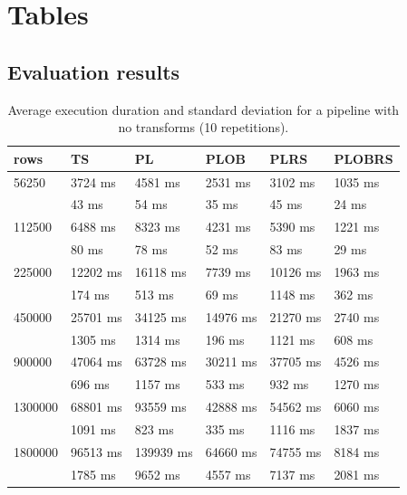 \section{Tables}
\label{appendix:example1}

\subsection{Evaluation results}
\label{app:eval:transforms}

\begin{table}[H]
	\caption{Average execution duration and standard deviation for a pipeline with no transforms (10 repetitions).}
	\label{tab:eval:none}
	\begin{center}
		\begin{tabular}{|l|l|l|l|l|l|}
			\hline
			rows    & TS       & PL        & PLOB     & PLRS     & PLOBRS  \\
			\hline
			\hline
			56250   & 3724 ms  & 4581 ms   & 2531 ms  & 3102 ms  & 1035 ms \\
			        & 43 ms    & 54 ms     & 35 ms    & 45 ms    & 24 ms   \\
			\hline
			112500  & 6488 ms  & 8323 ms   & 4231 ms  & 5390 ms  & 1221 ms \\
			        & 80 ms    & 78 ms     & 52 ms    & 83 ms    & 29 ms   \\
			\hline
			225000  & 12202 ms & 16118 ms  & 7739 ms  & 10126 ms & 1963 ms \\
			        & 174 ms   & 513 ms    & 69 ms    & 1148 ms  & 362 ms  \\
			\hline
			450000  & 25701 ms & 34125 ms  & 14976 ms & 21270 ms & 2740 ms \\
			        & 1305 ms  & 1314 ms   & 196 ms   & 1121 ms  & 608 ms  \\
			\hline
			900000  & 47064 ms & 63728 ms  & 30211 ms & 37705 ms & 4526 ms \\
			        & 696 ms   & 1157 ms   & 533 ms   & 932 ms   & 1270 ms \\
			\hline
			1300000 & 68801 ms & 93559 ms  & 42888 ms & 54562 ms & 6060 ms \\
			        & 1091 ms  & 823 ms    & 335 ms   & 1116 ms  & 1837 ms \\
			\hline
			1800000 & 96513 ms & 139939 ms & 64660 ms & 74755 ms & 8184 ms \\
			        & 1785 ms  & 9652 ms   & 4557 ms  & 7137 ms  & 2081 ms \\
			\hline
		\end{tabular}
	\end{center}
\end{table}

